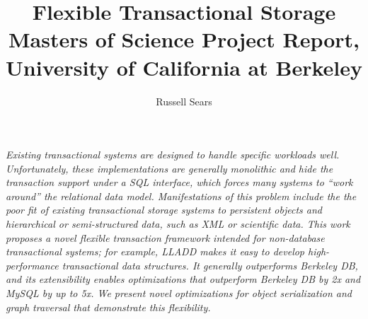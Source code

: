 \documentclass[10pt,letterpaper,twocolumn,english]{article}
\newcommand{\yad}{LLADD\xspace}
\begin{document}
\title{\vspace*{-36pt}Flexible Transactional Storage\\
\large{Masters of Science Project Report, University of California at Berkeley}}
\author{Russell Sears}
\maketitle



{\em Existing transactional systems are designed to handle specific
workloads well.  Unfortunately, these implementations are generally
monolithic and hide the transaction support under a SQL interface, which forces many systems to ``work around'' the relational data model.
Manifestations of this problem include the 
the poor fit of existing transactional storage systems to persistent
objects and hierarchical or semi-structured data, such as XML or
scientific data.  This work proposes a novel flexible transaction
framework intended for non-database transactional systems; for
example, \yad makes it easy to develop high-performance transactional
data structures. It generally outperforms Berkeley DB, and its
extensibility enables optimizations that outperform Berkeley DB by 2x
and MySQL by up to 5x.  We present novel optimizations for object
serialization and graph traversal that demonstrate this flexibility.}

\end{document}
